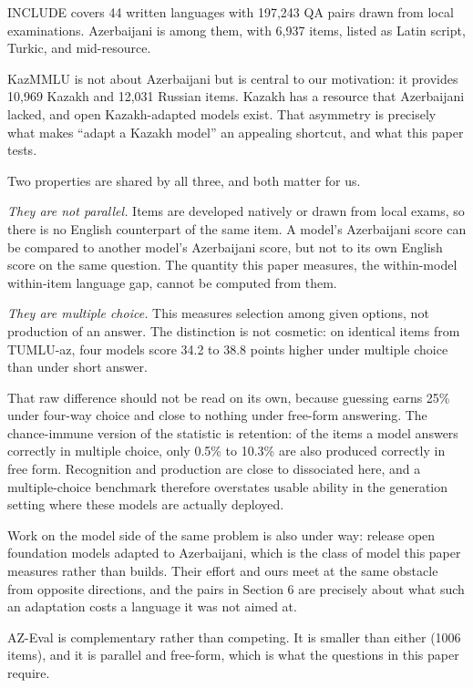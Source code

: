 \documentclass[final]{clv2025}
\begin{document}
INCLUDE \cite{romanou2025include} covers 44 written languages with 197,243 QA
pairs drawn from local examinations. Azerbaijani is among them, with 6,937
items, listed as Latin script, Turkic, and mid-resource.

KazMMLU \cite{togmanov2025kazmmlu} is not about Azerbaijani but is central to
our motivation: it provides 10,969 Kazakh and 12,031 Russian items. Kazakh has
a resource that Azerbaijani lacked, and open Kazakh-adapted models exist. That
asymmetry is precisely what makes ``adapt a Kazakh model'' an appealing
shortcut, and what this paper tests.

Two properties are shared by all three, and both matter for us.

\emph{They are not parallel.} Items are developed natively or drawn from local
exams, so there is no English counterpart of the same item. A model's
Azerbaijani score can be compared to another model's Azerbaijani score, but not
to its own English score on the same question. The quantity this paper
measures, the within-model within-item language gap, cannot be computed from
them.

\emph{They are multiple choice.} This measures selection among given options,
not production of an answer. The distinction is not cosmetic: on identical
items from TUMLU-az, four models score 34.2 to 38.8 points higher under
multiple choice than under short answer.

That raw difference should not be read on its own, because guessing earns 25\%
under four-way choice and close to nothing under free-form answering. The
chance-immune version of the statistic is retention: of the items a model
answers correctly in multiple choice, only 0.5\% to 10.3\% are also produced
correctly in free form. Recognition and production are close to dissociated
here, and a multiple-choice benchmark therefore overstates usable ability in
the generation setting where these models are actually deployed.

Work on the model side of the same problem is also under way:
 release open foundation models adapted to
Azerbaijani, which is the class of model this paper measures rather than
builds. Their effort and ours meet at the same obstacle from opposite
directions, and the pairs in Section 6 are precisely about what such an
adaptation costs a language it was not aimed at.

AZ-Eval is complementary rather than competing. It is smaller than either (1006
items), and it is parallel and free-form, which is what the questions in this
paper require.
\end{document}

